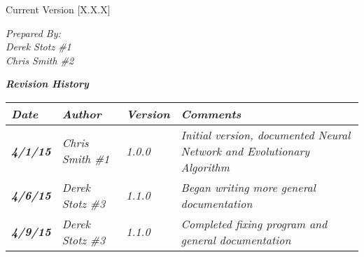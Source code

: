 


Current Version [X.X.X]
\vspace*{5mm}

{\color{MSBlue3}
\noindent
\textit{Prepared By:}\\
\textit{Derek Stotz \#1}\\
\textit{Chris Smith \#2}\\
}

\vfill
\noindent
{\color{color02} \textit{\textbf{Revision History}}}\\
\begin{tabular}{|>{\raggedright}p{1.5cm}|>{\raggedright}p{3cm}|>{\raggedright}p{1.5cm}|>{\raggedright}p{9cm}|}
\hline
\textit{\textbf{Date}} &  \textit{\textbf{Author}} & \textit{\textbf{Version}} & \textit{\textbf{Comments}}\tabularnewline
\hline
 \textit{\textbf{4/1/15}} & \textit{Chris Smith \#1} & \textit{1.0.0} & \textit{Initial version, documented Neural Network and Evolutionary Algorithm}\tabularnewline
\hline
\textit{\textbf{4/6/15}} & \textit{Derek Stotz \#3} & \textit{1.1.0} & \textit{Began writing more general documentation}\tabularnewline
\hline
\textit{\textbf{4/9/15}} & \textit{Derek Stotz \#3} & \textit{1.1.0} & \textit{Completed fixing program and general documentation}\tabularnewline
\hline
\end{tabular}
\vfill

